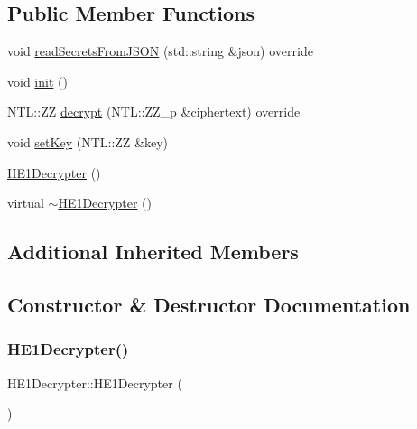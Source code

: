 \subsection*{Public Member Functions}
\begin{DoxyCompactItemize}
\item 
void \hyperlink{classHE1Decrypter_af60ccc6d0afe7555a9d1468ad7047733}{read\+Secrets\+From\+J\+S\+ON} (std\+::string \&json) override
\item 
void \hyperlink{classHE1Decrypter_ab10c6ecc422cbf5f492c7a039e2da97c}{init} ()
\item 
N\+T\+L\+::\+ZZ \hyperlink{classHE1Decrypter_a28cc03e8a37f321b8f805cc04b2e69e0}{decrypt} (N\+T\+L\+::\+Z\+Z\+\_\+p \&ciphertext) override
\item 
void \hyperlink{classHE1Decrypter_a7b06b69bcd5ef096067232f819321482}{set\+Key} (N\+T\+L\+::\+ZZ \&key)
\item 
\hyperlink{classHE1Decrypter_a68c49940560941d85b53e1b8d8d20df1}{H\+E1\+Decrypter} ()
\item 
virtual \hyperlink{classHE1Decrypter_aa1cdd009aae80628b7508c13430adae5}{$\sim$\+H\+E1\+Decrypter} ()
\end{DoxyCompactItemize}
\subsection*{Additional Inherited Members}


\subsection{Constructor \& Destructor Documentation}
\mbox{\label{classHE1Decrypter_a68c49940560941d85b53e1b8d8d20df1}} 
\subsubsection{\texorpdfstring{H\+E1\+Decrypter()}{HE1Decrypter()}}
{\footnotesize\ttfamily H\+E1\+Decrypter\+::\+H\+E1\+Decrypter (\begin{DoxyParamCaption}{ }\end{DoxyParamCaption})}

\mbox{\label{classHE1Decrypter_aa1cdd009aae80628b7508c13430adae5}} 
